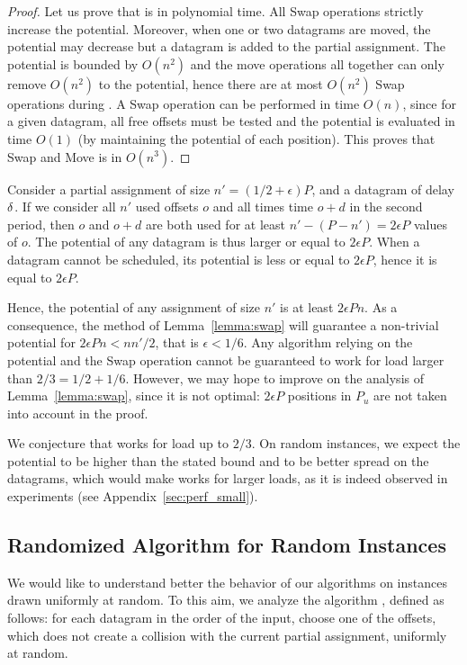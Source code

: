 \begin{proof}
Let us prove that \swapandmove is in polynomial time. All Swap operations 
strictly increase the potential. Moreover, when one or two datagrams are moved, the potential may decrease but
a datagram is added to the partial assignment. The potential is bounded by $O(n^2)$ and the move operations all together can only remove $O(n^2)$ to the potential, hence there are at most $O(n^2)$ Swap operations during \swapandmove. A Swap operation can be performed in time $O(n)$, since for a given datagram, all free offsets must be tested and the potential is evaluated in time $O(1)$ (by maintaining the potential of each position). This proves that Swap and Move is in $O(n^3)$.  
\end{proof}

Consider a partial assignment of size $n' = (1/2 + \epsilon)P$, and a datagram of delay $\delta$.
If we consider all $n'$ used offsets $o$ and all times time $o+d$ in the second period, 
then $o$ and $o+d$ are both used for at least $n' - (P -n') = 2\epsilon P$ values of $o$.
The potential of any datagram is thus larger or equal to $2\epsilon P$. When a datagram cannot be scheduled, its potential is less or equal to $2\epsilon P$, hence it is equal to $2\epsilon P$.

Hence, the potential of any assignment of size $n'$ is at least $2\epsilon P n $. As a consequence, the method of Lemma~\ref{lemma:swap} will guarantee a non-trivial potential for $2\epsilon P n <  nn'/2$, that is $\epsilon < 1/6$. Any algorithm relying on the potential and the Swap operation cannot be guaranteed to work for load larger than $2/3 = 1/2 + 1/6$. However, we may hope to improve on the analysis of Lemma~\ref{lemma:swap}, since it is not optimal: $2\epsilon P$ positions in $P_{u}$ are not taken into account in the proof. 

We conjecture that \swapandmove works for load up to $2/3$. 
On random instances, we expect the potential to be higher than the stated bound and to be better spread on the datagrams, which would make \swapandmove works for larger loads, as it is indeed observed in experiments (see Appendix~\ref{sec:perf_small}).

\subsection{Randomized Algorithm for Random Instances}

We would like to understand better the behavior of our algorithms
on instances drawn uniformly at random. To this aim, we analyze the algorithm \greedyuniform, defined as follows: for each datagram in the order of the input, choose one of the offsets, which does not create a collision with the current partial assignment, uniformly at random. 

